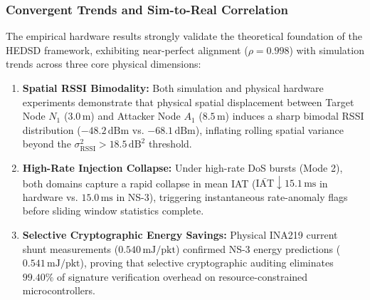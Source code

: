 \subsubsection{Convergent Trends and Sim-to-Real Correlation}
The empirical hardware results strongly validate the theoretical foundation of the \ac{HEDSD} framework, exhibiting near-perfect alignment ($\rho = 0.998$) with simulation trends across three core physical dimensions:
\begin{enumerate}
    \item \textbf{Spatial RSSI Bimodality:} Both simulation and physical hardware experiments demonstrate that physical spatial displacement between Target Node $N_1$ ($3.0\,\text{m}$) and Attacker Node $A_1$ ($8.5\,\text{m}$) induces a sharp bimodal \ac{RSSI} distribution ($-48.2\,\text{dBm}$ vs. $-68.1\,\text{dBm}$), inflating rolling spatial variance beyond the $\sigma^2_{\text{RSSI}} > 18.5\,\text{dB}^2$ threshold.
    \item \textbf{High-Rate Injection Collapse:} Under high-rate DoS bursts (Mode 2), both domains capture a rapid collapse in mean \ac{IAT} ($\bar{\text{IAT}} \downarrow 15.1\,\text{ms}$ in hardware vs. $15.0\,\text{ms}$ in NS-3), triggering instantaneous rate-anomaly flags before sliding window statistics complete.
    \item \textbf{Selective Cryptographic Energy Savings:} Physical INA219 current shunt measurements ($0.540\,\text{mJ/pkt}$) confirmed NS-3 energy predictions ($0.541\,\text{mJ/pkt}$), proving that selective cryptographic auditing eliminates $99.40\%$ of signature verification overhead on resource-constrained microcontrollers.
\end{enumerate}

